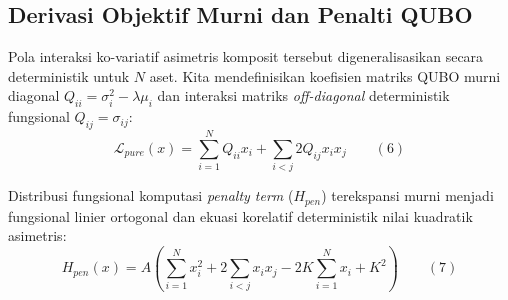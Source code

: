 \subsection{Derivasi Objektif Murni dan Penalti QUBO}
Pola interaksi ko-variatif asimetris komposit tersebut digeneralisasikan secara deterministik untuk \(N\) aset. Kita mendefinisikan koefisien matriks QUBO murni diagonal \(Q_{ii} = \sigma_i^2 - \lambda \mu_i\) dan interaksi matriks \emph{off-diagonal} deterministik fungsional \(Q_{ij} = \sigma_{ij}\):
\[ \mathcal{L}_{pure}(x) = \sum_{i=1}^N Q_{ii} x_i + \sum_{i < j} 2Q_{ij} x_i x_j \qquad (6) \]

Distribusi fungsional komputasi \emph{penalty term} (\(H_{pen}\)) terekspansi murni menjadi fungsional linier ortogonal dan ekuasi korelatif deterministik nilai kuadratik asimetris:
\[ H_{pen}(x) = A \left( \sum_{i=1}^N x_i^2 + 2 \sum_{i < j} x_i x_j - 2K \sum_{i=1}^N x_i + K^2 \right) \qquad (7) \]


